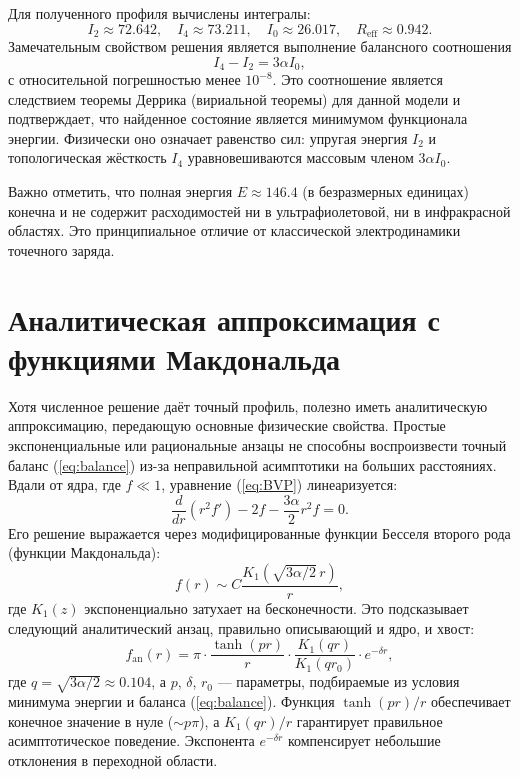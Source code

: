 \documentclass[12pt]{article}
\begin{document}
Для полученного профиля вычислены интегралы:
\[
I_2 \approx 72.642,\quad I_4 \approx 73.211,\quad I_0 \approx 26.017,\quad R_{\text{eff}} \approx 0.942.
\]
Замечательным свойством решения является выполнение балансного соотношения
\begin{equation}
I_4 - I_2 = 3\alpha I_0,
\label{eq:balance}
\end{equation}
с относительной погрешностью менее $10^{-8}$. Это соотношение является следствием теоремы Деррика (вириальной теоремы) для данной модели и подтверждает, что найденное состояние является минимумом функционала энергии. Физически оно означает равенство сил: упругая энергия $I_2$ и топологическая жёсткость $I_4$ уравновешиваются массовым членом $3\alpha I_0$.

Важно отметить, что полная энергия $E \approx 146.4$ (в безразмерных единицах) конечна и не содержит расходимостей ни в ультрафиолетовой, ни в инфракрасной областях. Это принципиальное отличие от классической электродинамики точечного заряда.

\section{Аналитическая аппроксимация с функциями Макдональда}
\label{sec:analytic}

Хотя численное решение даёт точный профиль, полезно иметь аналитическую аппроксимацию, передающую основные физические свойства. Простые экспоненциальные или рациональные анзацы не способны воспроизвести точный баланс (\ref{eq:balance}) из-за неправильной асимптотики на больших расстояниях. Вдали от ядра, где $f \ll 1$, уравнение (\ref{eq:BVP}) линеаризуется:
\[
\frac{d}{dr}\left( r^2 f' \right) - 2 f - \frac{3\alpha}{2} r^2 f = 0.
\]
Его решение выражается через модифицированные функции Бесселя второго рода (функции Макдональда):
\[
f(r) \sim C \frac{K_1(\sqrt{3\alpha/2}\, r)}{r},
\]
где $K_1(z)$ экспоненциально затухает на бесконечности. Это подсказывает следующий аналитический анзац, правильно описывающий и ядро, и хвост:
\begin{equation}
f_{\text{an}}(r) = \pi \cdot \frac{\tanh(p r)}{r} \cdot \frac{K_1(q r)}{K_1(q r_0)} \cdot e^{-\delta r},
\label{eq:ansatz}
\end{equation}
где $q = \sqrt{3\alpha/2} \approx 0.104$, а $p$, $\delta$, $r_0$ --- параметры, подбираемые из условия минимума энергии и баланса (\ref{eq:balance}). Функция $\tanh(pr)/r$ обеспечивает конечное значение в нуле ($\sim p\pi$), а $K_1(qr)/r$ гарантирует правильное асимптотическое поведение. Экспонента $e^{-\delta r}$ компенсирует небольшие отклонения в переходной области.
\end{document}

